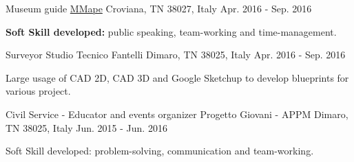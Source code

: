 \begin{cventries}
  \cventry
    {Museum guide} %
    {\href{https://www.mmape.it}{MMape}} %
    {Croviana, TN 38027, Italy} %
    {Apr. 2016 - Sep. 2016} %
    {
      \begin{cvitems} %
        \item {\textbf{Soft Skill developed:} public speaking, team-working and time-management.}
      \end{cvitems}
    }

  \cventry
    {Surveyor} %
    {Studio Tecnico Fantelli} %
    {Dimaro, TN 38025, Italy} %
    {Apr. 2016 - Sep. 2016} %
    {
      \begin{cvitems} %
        \item {Large usage of CAD 2D, CAD 3D and Google Sketchup to develop blueprints for various project.}
      \end{cvitems}
    }

  \cventry
    {Civil Service - Educator and events organizer} %
    {Progetto Giovani - APPM} %
    {Dimaro, TN 38025, Italy} %
    {Jun. 2015 - Jun. 2016} %
    {
      \begin{cvitems} %
        \item {Soft Skill developed: problem-solving, communication and team-working.}
      \end{cvitems}
    }

\end{cventries}
